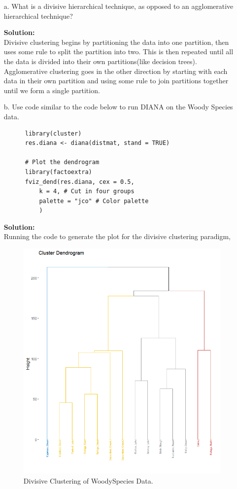 \documentclass[12pt]{article}
\makeatletter
\theoremstyle{homework}
\newenvironment{exercise}[1]
{\def\@currentlabel{#1}\exercisecore}
{\endexercisecore}
\newcommand{\localhead}[1]{\par\smallskip\noindent\textbf{#1}\nobreak\\}%
\newcommand\solution{\localhead{Solution:}}
\makeatother
\begin{document}
\begin{exercise}{4} 
  \begin{enumerate}
    \item[a.] What is a divisive hierarchical technique, as opposed to an agglomerative hierarchical technique?\\
    \solution Divisive clustering begins by partitioning the data into one partition, then uses some rule to split the partition into two. This is then repeated 
    until all the data is divided into their own partitions(like decision trees). Agglomerative clustering goes in the other direction by starting with each data in their own partition 
    and using some rule to join partitions together until we form a single partition. 
    \vspace{.15in}
    
    \item[b.] Use code similar to the code below to run DIANA on the Woody Species data.\\
    \begin{footnotesize}
      \begin{verbatim}
      library(cluster)
      res.diana <- diana(distmat, stand = TRUE)
      
      # Plot the dendrogram
      library(factoextra)
      fviz_dend(res.diana, cex = 0.5,
          k = 4, # Cut in four groups
          palette = "jco" # Color palette
          )
      \end{verbatim}
      \end{footnotesize}
      \solution Running the code to generate the plot for the divisive clustering paradigm, 

      \begin{figure}[H]
        \begin{center}
          \caption{Divisive Clustering of WoodySpecies Data.}
        \includegraphics[width = .70\textwidth]{Rplot11.png}
        \end{center}
    \end{figure}


\end{enumerate}
\end{exercise}
\end{document}
